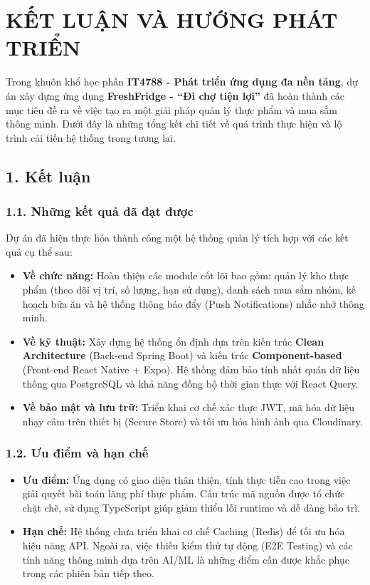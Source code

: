 \section*{KẾT LUẬN VÀ HƯỚNG PHÁT TRIỂN}
Trong khuôn khổ học phần \textbf{IT4788 - Phát triển ứng dụng đa nền tảng}, dự án xây dựng ứng dụng \textbf{FreshFridge - ``Đi chợ tiện lợi''} đã hoàn thành các mục tiêu đề ra về việc tạo ra một giải pháp quản lý thực phẩm và mua sắm thông minh. Dưới đây là những tổng kết chi tiết về quá trình thực hiện và lộ trình cải tiến hệ thống trong tương lai.

\subsection*{1. Kết luận}

\subsubsection*{1.1. Những kết quả đã đạt được}
Dự án đã hiện thực hóa thành công một hệ thống quản lý tích hợp với các kết quả cụ thể sau:
\begin{itemize}
    \item \textbf{Về chức năng:} Hoàn thiện các module cốt lõi bao gồm: quản lý kho thực phẩm (theo dõi vị trí, số lượng, hạn sử dụng), danh sách mua sắm nhóm, kế hoạch bữa ăn và hệ thống thông báo đẩy (Push Notifications) nhắc nhở thông minh.
    \item \textbf{Về kỹ thuật:} Xây dựng hệ thống ổn định dựa trên kiến trúc \textbf{Clean Architecture} (Back-end Spring Boot) và kiến trúc \textbf{Component-based} (Front-end React Native + Expo). Hệ thống đảm bảo tính nhất quán dữ liệu thông qua PostgreSQL và khả năng đồng bộ thời gian thực với React Query.
    \item \textbf{Về bảo mật và lưu trữ:} Triển khai cơ chế xác thực JWT, mã hóa dữ liệu nhạy cảm trên thiết bị (Secure Store) và tối ưu hóa hình ảnh qua Cloudinary.
\end{itemize}

\subsubsection*{1.2. Ưu điểm và hạn chế}
\begin{itemize}
    \item \textbf{Ưu điểm:} Ứng dụng có giao diện thân thiện, tính thực tiễn cao trong việc giải quyết bài toán lãng phí thực phẩm. Cấu trúc mã nguồn được tổ chức chặt chẽ, sử dụng TypeScript giúp giảm thiểu lỗi runtime và dễ dàng bảo trì.
    \item \textbf{Hạn chế:} Hệ thống chưa triển khai cơ chế Caching (Redis) để tối ưu hóa hiệu năng API. Ngoài ra, việc thiếu kiểm thử tự động (E2E Testing) và các tính năng thông minh dựa trên AI/ML là những điểm cần được khắc phục trong các phiên bản tiếp theo.
\end{itemize}



